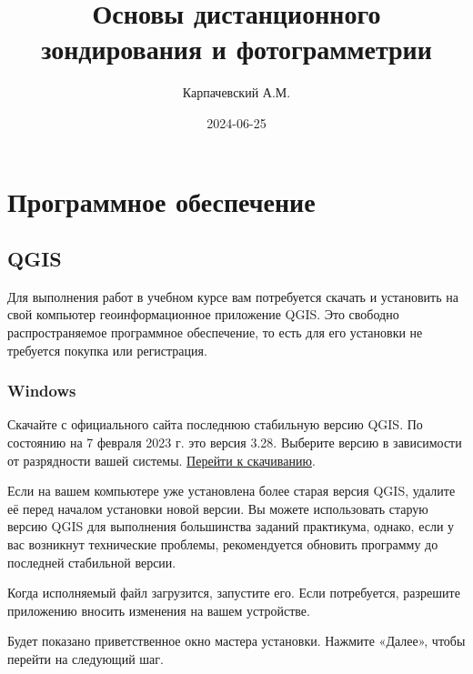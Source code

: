 \documentclass[
  12pt,
]{book}
\title{Основы дистанционного зондирования и фотограмметрии}
\author{Карпачевский А.М.}
\date{2024-06-25}
\begin{document}
\maketitle

{
\hypersetup{linkcolor=}
\setcounter{tocdepth}{1}
\tableofcontents
}
\hypertarget{ux43fux440ux43eux433ux440ux430ux43cux43cux43dux43eux435-ux43eux431ux435ux441ux43fux435ux447ux435ux43dux438ux435}{%
\chapter*{Программное обеспечение}\label{ux43fux440ux43eux433ux440ux430ux43cux43cux43dux43eux435-ux43eux431ux435ux441ux43fux435ux447ux435ux43dux438ux435}}

\hypertarget{qgis}{%
\section*{QGIS}\label{qgis}}

Для выполнения работ в учебном курсе вам потребуется скачать и установить на свой компьютер геоинформационное приложение QGIS. Это свободно распространяемое программное обеспечение, то есть для его установки не требуется покупка или регистрация.

\hypertarget{windows}{%
\subsection*{Windows}\label{windows}}

Скачайте с официального сайта последнюю стабильную версию QGIS. По состоянию на 7 февраля 2023 г. это версия 3.28. Выберите версию в зависимости от разрядности вашей системы. \href{https://qgis.org/downloads/QGIS-OSGeo4W-3.16.16-1.msi}{Перейти к скачиванию}.

Если на вашем компьютере уже установлена более старая версия QGIS, удалите её перед началом установки новой версии. Вы можете использовать старую версию QGIS для выполнения большинства заданий практикума, однако, если у вас возникнут технические проблемы, рекомендуется обновить программу до последней стабильной версии.

Когда исполняемый файл загрузится, запустите его. Если потребуется, разрешите приложению вносить изменения на вашем устройстве.

Будет показано приветственное окно мастера установки. Нажмите «Далее», чтобы перейти на следующий шаг.
\end{document}
